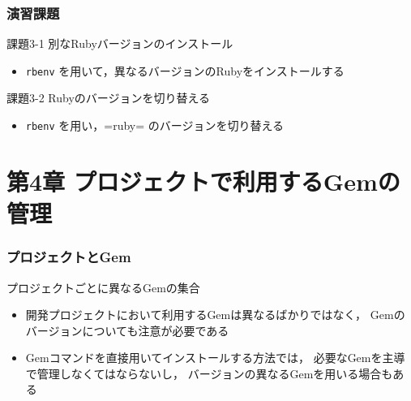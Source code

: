\documentclass[t, aspectratio=169]{beamer}
\begin{document}
\section{演習課題}
\label{sec-3-2}
\begin{frame}[fragile,label=sec-3-2-1]{課題3-1 別なRubyバージョンのインストール}
 \begin{itemize}
\item \texttt{rbenv} を用いて，異なるバージョンのRubyをインストールする
\end{itemize}
\end{frame}
\begin{frame}[fragile,label=sec-3-2-2]{課題3-2 Rubyのバージョンを切り替える}
 \begin{itemize}
\item \texttt{rbenv} を用い，=ruby= のバージョンを切り替える
\end{itemize}
\end{frame}
\part{第4章 プロジェクトで利用するGemの管理}
\label{sec-4}
\section{プロジェクトとGem}
\label{sec-4-1}
\begin{frame}[label=sec-4-1-1]{プロジェクトごとに異なるGemの集合}
\begin{itemize}
\item 開発プロジェクトにおいて利用するGemは異なるばかりではなく，
Gemのバージョンについても注意が必要である
\item Gemコマンドを直接用いてインストールする方法では，
必要なGemを主導で管理しなくてはならないし，
バージョンの異なるGemを用いる場合もある
\end{itemize}
\end{frame}
\end{document}
